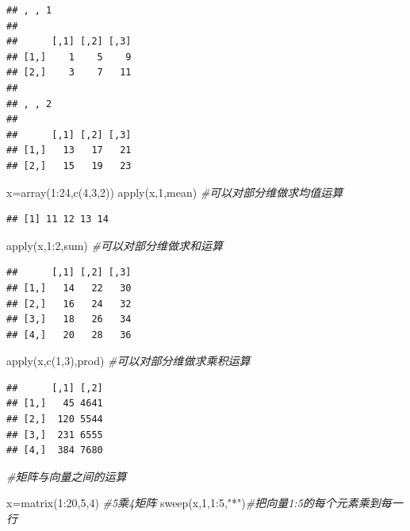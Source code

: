 \documentclass[
]{book}
\newenvironment{Shaded}{\begin{snugshade}}{\end{snugshade}}
\newcommand{\CommentTok}[1]{\textcolor[rgb]{0.56,0.35,0.01}{\textit{#1}}}
\newcommand{\DecValTok}[1]{\textcolor[rgb]{0.00,0.00,0.81}{#1}}
\newcommand{\FunctionTok}[1]{\textcolor[rgb]{0.00,0.00,0.00}{#1}}
\newcommand{\NormalTok}[1]{#1}
\newcommand{\OtherTok}[1]{\textcolor[rgb]{0.56,0.35,0.01}{#1}}
\newcommand{\SpecialCharTok}[1]{\textcolor[rgb]{0.00,0.00,0.00}{#1}}
\newcommand{\StringTok}[1]{\textcolor[rgb]{0.31,0.60,0.02}{#1}}
\begin{document}
\begin{verbatim}
## , , 1
## 
##      [,1] [,2] [,3]
## [1,]    1    5    9
## [2,]    3    7   11
## 
## , , 2
## 
##      [,1] [,2] [,3]
## [1,]   13   17   21
## [2,]   15   19   23
\end{verbatim}

\begin{Shaded}
\begin{Highlighting}[]
\NormalTok{x}\OtherTok{=}\FunctionTok{array}\NormalTok{(}\DecValTok{1}\SpecialCharTok{:}\DecValTok{24}\NormalTok{,}\FunctionTok{c}\NormalTok{(}\DecValTok{4}\NormalTok{,}\DecValTok{3}\NormalTok{,}\DecValTok{2}\NormalTok{))}
\FunctionTok{apply}\NormalTok{(x,}\DecValTok{1}\NormalTok{,mean)   }\CommentTok{\#可以对部分维做求均值运算}
\end{Highlighting}
\end{Shaded}

\begin{verbatim}
## [1] 11 12 13 14
\end{verbatim}

\begin{Shaded}
\begin{Highlighting}[]
\FunctionTok{apply}\NormalTok{(x,}\DecValTok{1}\SpecialCharTok{:}\DecValTok{2}\NormalTok{,sum)  }\CommentTok{\#可以对部分维做求和运算}
\end{Highlighting}
\end{Shaded}

\begin{verbatim}
##      [,1] [,2] [,3]
## [1,]   14   22   30
## [2,]   16   24   32
## [3,]   18   26   34
## [4,]   20   28   36
\end{verbatim}

\begin{Shaded}
\begin{Highlighting}[]
\FunctionTok{apply}\NormalTok{(x,}\FunctionTok{c}\NormalTok{(}\DecValTok{1}\NormalTok{,}\DecValTok{3}\NormalTok{),prod) }\CommentTok{\#可以对部分维做求乘积运算}
\end{Highlighting}
\end{Shaded}

\begin{verbatim}
##      [,1] [,2]
## [1,]   45 4641
## [2,]  120 5544
## [3,]  231 6555
## [4,]  384 7680
\end{verbatim}

\begin{Shaded}
\begin{Highlighting}[]
\CommentTok{\#矩阵与向量之间的运算}

\NormalTok{x}\OtherTok{=}\FunctionTok{matrix}\NormalTok{(}\DecValTok{1}\SpecialCharTok{:}\DecValTok{20}\NormalTok{,}\DecValTok{5}\NormalTok{,}\DecValTok{4}\NormalTok{) }\CommentTok{\#5乘4矩阵}
\FunctionTok{sweep}\NormalTok{(x,}\DecValTok{1}\NormalTok{,}\DecValTok{1}\SpecialCharTok{:}\DecValTok{5}\NormalTok{,}\StringTok{"*"}\NormalTok{)}\CommentTok{\#把向量1:5的每个元素乘到每一行}
\end{Highlighting}
\end{Shaded}
\end{document}
